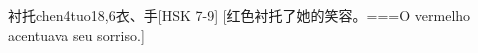\begin{EntryWithPhonetic}{衬托}{chen4tuo1}{8,6}{⾐、⼿}[HSK 7-9]
  [红色衬托了她的笑容。===O vermelho acentuava seu sorriso.]
\end{EntryWithPhonetic}
